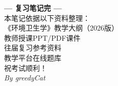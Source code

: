 \documentclass[10pt,a4paper,oneside]{ctexbook}
\begin{document}
\newpage

\vspace*{3cm}
\begin{center}
    {\Large\color{main}\textbf{--- 复习笔记完 ---}}\\[20pt]
    {\normalsize\color{gray!70}
    本笔记依据以下资料整理：\\[5pt]
    《环境卫生学》教学大纲（2026版）\\
    教师授课PPT/PDF课件\\
    往届复习参考资料\\
    教学平台在线题库\\
    \vspace{20pt}
    祝考试顺利！\\[20pt]
    \textit{By greedyCat}
    }
\end{center}
\end{document}
